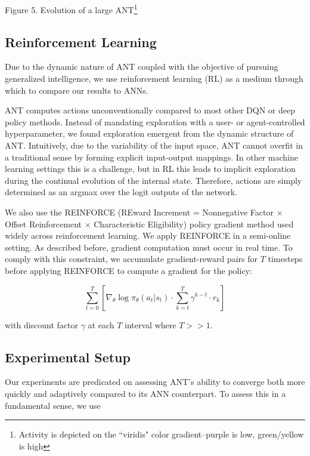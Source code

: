 \documentclass{article}
\begin{document}
\begin{multicols}{2}
\begin{center}
		{\small Figure 5. Evolution of a large ANT\footnote{Activity is depicted on the ``viridis" color gradient--purple is low, green/yellow is high}}
	\end{center}
	
	\subsection{Reinforcement Learning}
	
	Due to the dynamic nature of ANT coupled with the objective of pursuing generalized intelligence, we use reinforcement learning (RL) as a medium through which to compare our results to ANNs.
	
	ANT computes actions unconventionally compared to most other DQN or deep policy methods. Instead of mandating exploration with a user- or agent-controlled hyperparameter, we found exploration emergent from the dynamic structure of ANT. Intuitively, due to the variability of the input space, ANT cannot overfit in a traditional sense by forming explicit input-output mappings. In other machine learning settings this is a challenge, but in RL this leads to implicit exploration during the continual evolution of the internal state. Therefore, actions are simply determined as an argmax over the logit outputs of the network.
	
	We also use the REINFORCE (REward Increment = Nonnegative Factor × Offset Reinforcement × Characteristic Eligibility) \cite{williams1992} policy gradient method used widely across reinforcement learning. We apply REINFORCE in a semi-online setting. As described before, gradient computation must occur in real time. To comply with this constraint, we accumulate gradient-reward pairs for $T$ timesteps before applying REINFORCE to compute a gradient for the policy:
	
	\[\sum_{t=0}^{T} \left[\nabla_{\theta} \log \pi_{\theta}(a_t|s_t) \cdot \sum_{k=t}^{T} \gamma^{k-t} \cdot r_k \right]\]
	
	\medskip \noindent with discount factor $\gamma$ at each $T$ interval where $T >> 1$.

	\subsection{Experimental Setup}
	
	Our experiments are predicated on assessing ANT's ability to converge both more quickly and adaptively compared to its ANN counterpart. To assess this in a fundamental sense, we use 
	

\end{multicols}
\end{document}
